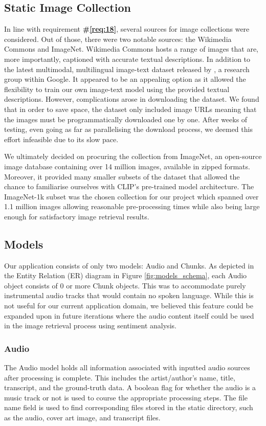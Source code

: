 \documentclass{l4proj}
\begin{document}
\subsection{Static Image Collection}
In line with requirement \textbf{\#\ref{req:18}}, several sources for image collections were considered. Out of those, there were two notable sources: the Wikimedia Commons and ImageNet. Wikimedia Commons hosts a range of images that are, more importantly, captioned with accurate textual descriptions. In addition to the latest multimodal, multilingual image-text dataset released by \cite{srinivasan2021wit}, a research group within Google. It appeared to be an appealing option as it allowed the flexibility to train our own image-text model using the provided textual descriptions. However, complications arose in downloading the dataset. We found that in order to save space, the dataset only included image URLs meaning that the images must be programmatically downloaded one by one. After weeks of testing, even going as far as parallelising the download process, we deemed this effort infeasible due to its slow pace. 

We ultimately decided on procuring the collection from ImageNet, an open-source image database containing over 14 million images, available in zipped formats. Moreover, it provided many smaller subsets of the dataset that allowed the chance to familiarise ourselves with CLIP's pre-trained model architecture. The ImageNet-1k subset was the chosen collection for our project which spanned over 1.1 million images allowing reasonable pre-processing times while also being large enough for satisfactory image retrieval results.


\subsection{Models}
Our application consists of only two models: Audio and Chunks. As depicted in the Entity Relation (ER) diagram in Figure \ref{fig:models_schema}, each Audio object consists of 0 or more Chunk objects. This was to accommodate purely instrumental audio tracks that would contain no spoken language. While this is not useful for our current application domain, we believed this feature could be expanded upon in future iterations where the audio content itself could be used in the image retrieval process using sentiment analysis.

\subsubsection{Audio}
The Audio model holds all information associated with inputted audio sources after processing is complete. This includes the artist/author's name, title, transcript, and the ground-truth data. A boolean flag for whether the audio is a music track or not is used to course the appropriate processing steps. The file name field is used to find corresponding files stored in the static directory, such as the audio, cover art image, and transcript files. 
\end{document}
